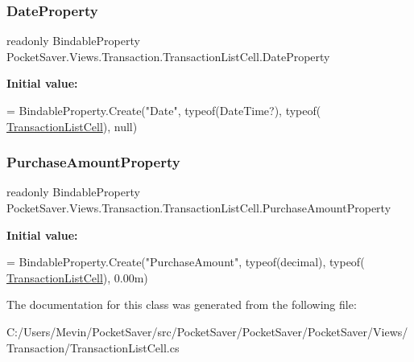 \subsubsection{\texorpdfstring{Date\+Property}{DateProperty}}
{\footnotesize\ttfamily readonly Bindable\+Property Pocket\+Saver.\+Views.\+Transaction.\+Transaction\+List\+Cell.\+Date\+Property\hspace{0.3cm}{\ttfamily [static]}}

{\bfseries Initial value\+:}
\begin{DoxyCode}
=
            BindableProperty.Create(\textcolor{stringliteral}{"Date"}, typeof(DateTime?), typeof(
      \hyperlink{class_pocket_saver_1_1_views_1_1_transaction_1_1_transaction_list_cell_a26039352cfde76eb1bca9b6c2141fae1}{TransactionListCell}), null)
\end{DoxyCode}
\mbox{\label{class_pocket_saver_1_1_views_1_1_transaction_1_1_transaction_list_cell_aabf6dc4177c779f522a46f61f843ed49}} 
\subsubsection{\texorpdfstring{Purchase\+Amount\+Property}{PurchaseAmountProperty}}
{\footnotesize\ttfamily readonly Bindable\+Property Pocket\+Saver.\+Views.\+Transaction.\+Transaction\+List\+Cell.\+Purchase\+Amount\+Property\hspace{0.3cm}{\ttfamily [static]}}

{\bfseries Initial value\+:}
\begin{DoxyCode}
=
            BindableProperty.Create(\textcolor{stringliteral}{"PurchaseAmount"}, typeof(decimal), typeof(
      \hyperlink{class_pocket_saver_1_1_views_1_1_transaction_1_1_transaction_list_cell_a26039352cfde76eb1bca9b6c2141fae1}{TransactionListCell}), 0.00m)
\end{DoxyCode}


The documentation for this class was generated from the following file\+:\begin{DoxyCompactItemize}
\item 
C\+:/\+Users/\+Mevin/\+Pocket\+Saver/src/\+Pocket\+Saver/\+Pocket\+Saver/\+Pocket\+Saver/\+Views/\+Transaction/Transaction\+List\+Cell.\+cs\end{DoxyCompactItemize}
